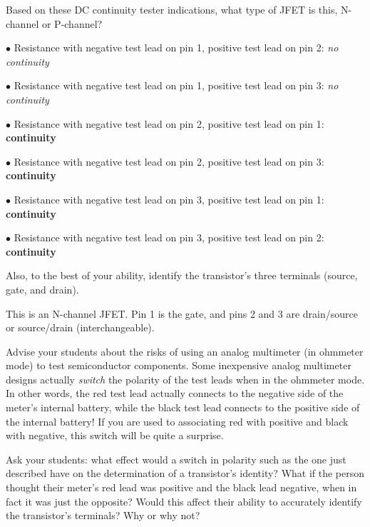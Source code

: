 

Based on these DC continuity tester indications, what type of JFET is this, N-channel or P-channel?

\medskip
\item{$\bullet$} Resistance with negative test lead on pin 1, positive test lead on pin 2: {\it no continuity}
\item{$\bullet$} Resistance with negative test lead on pin 1, positive test lead on pin 3: {\it no continuity}
\item{$\bullet$} Resistance with negative test lead on pin 2, positive test lead on pin 1: {\bf continuity}
\item{$\bullet$} Resistance with negative test lead on pin 2, positive test lead on pin 3: {\bf continuity}
\item{$\bullet$} Resistance with negative test lead on pin 3, positive test lead on pin 1: {\bf continuity}
\item{$\bullet$} Resistance with negative test lead on pin 3, positive test lead on pin 2: {\bf continuity}
\medskip

Also, to the best of your ability, identify the transistor's three terminals (source, gate, and drain).







This is an N-channel JFET.  Pin 1 is the gate, and pins 2 and 3 are drain/source or source/drain (interchangeable).







Advise your students about the risks of using an analog multimeter (in ohmmeter mode) to test semiconductor components.  Some inexpensive analog multimeter designs actually {\it switch} the polarity of the test leads when in the ohmmeter mode.  In other words, the red test lead actually connects to the negative side of the meter's internal battery, while the black test lead connects to the positive side of the internal battery!  If you are used to associating red with positive and black with negative, this switch will be quite a surprise.

Ask your students: what effect would a switch in polarity such as the one just described have on the determination of a transistor's identity?  What if the person thought their meter's red lead was positive and the black lead negative, when in fact it was just the opposite?  Would this affect their ability to accurately identify the transistor's terminals?  Why or why not?




